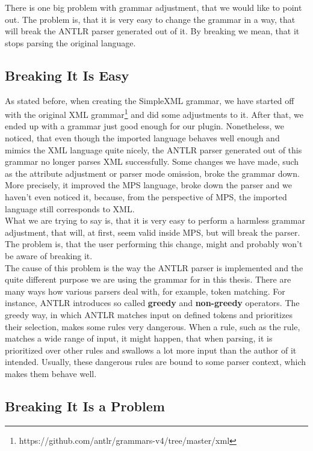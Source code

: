 There is one big problem with grammar adjustment, that we would like to point out.
The problem is, that it is very easy to change the grammar in a way, that will break the ANTLR parser generated out of it.
By breaking we mean, that it stops parsing the original language.

\subsection{Breaking It Is Easy}

As stated before, when creating the SimpleXML grammar, we have started off with the original XML grammar\footnote{https://github.com/antlr/grammars-v4/tree/master/xml} and did some adjustments to it.
After that, we ended up with a grammar just good enough for our plugin.
Nonetheless, we noticed, that even though the imported language behaves well enough and mimics the XML language quite nicely, the ANTLR parser generated out of this grammar no longer parses XML successfully.
Some changes we have made, such as the attribute adjustment or parser mode omission, broke the grammar down.
More precisely, it improved the MPS language, broke down the parser and we haven't even noticed it, because, from the perspective of MPS, the imported language still corresponds to XML.
\\

What we are trying to say is, that it is very easy to perform a harmless grammar adjustment, that will, at first, seem valid inside MPS, but will break the parser.
The problem is, that the user performing this change, might and probably won't be aware of breaking it.
\\

The cause of this problem is the way the ANTLR parser is implemented and the quite different purpose we are using the grammar for in this thesis.
There are many ways how various parsers deal with, for example, token matching.
For instance, ANTLR introduces so called \textbf{greedy} and \textbf{non-greedy} operators.
The greedy way, in which ANTLR matches input on defined tokens and prioritizes their selection, makes some rules very dangerous.
When a rule, such as the  rule, matches a wide range of input, it might happen, that when parsing, it is prioritized over other rules and swallows a lot more input than the author of it intended.
Usually, these dangerous rules are bound to some parser context, which makes them behave well.

\subsection{Breaking It Is a Problem}

